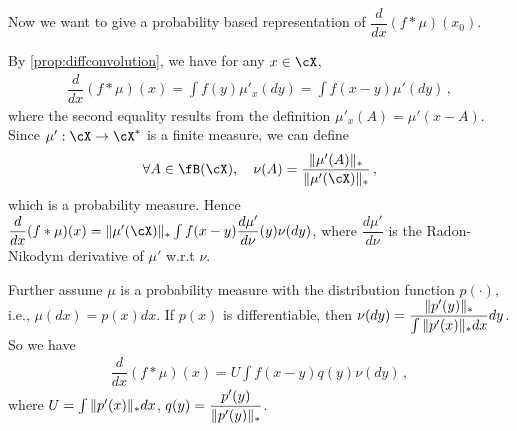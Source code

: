 \documentclass[11pt,letterpaper,english]{article}
\newcommand{\Borel}{\fB}
\begin{document}
Now we want to give a probability based representation of $\dfrac{d}{dx} (f*\mu) (x_0)$.

By \cref{prop:diffconvolution}, we have for any $x\in \cX$,
\begin{align*}
\dfrac{d}{dx} (f*\mu) (x) = \int f(y)\mu'_{x}(dy)
= \int f(x-y)\mu'(dy) \,,
\end{align*}
where the second equality results from the definition $\mu'_{x}(A)=\mu'(x-A)$. Since $\mu':\cX\to \cX^*$ is a finite measure, we can define 
\begin{align*}
\forall A \in \Borel(\cX), \quad
\nu(A) = \dfrac{\norm{\mu'(A)}_*}{\norm{\mu'(\cX)}_*}\,,
\end{align*}
which is a probability measure. Hence 
$\dfrac{d}{dx} (f*\mu) (x) = \norm{\mu'(\cX)}_* \int f(x-y) \dfrac{d\mu'}{d\nu}(y) \nu(dy)$, where $\dfrac{d\mu'}{d\nu}$ is the Radon-Nikodym derivative of $\mu'$ w.r.t $\nu$.

Further assume $\mu$ is a probability measure with the distribution function $p(\cdot)$, i.e., $\mu(dx) = p(x)dx$. If $p(x)$ is differentiable, then
$\nu(dy) = \dfrac{\|p'(y)\|_*}{\int \|p'(x)\|_*dx}dy$.
So we have
\begin{align*}
\dfrac{d}{dx} (f*\mu) (x) = U \int f(x-y) q(y) \nu (dy)\,,
\end{align*}
where $U = \int \|p'(x)\|_*dx$, $q(y) = \dfrac{p'(y)}{\|p'(y)\|_*}$.
\end{document}
